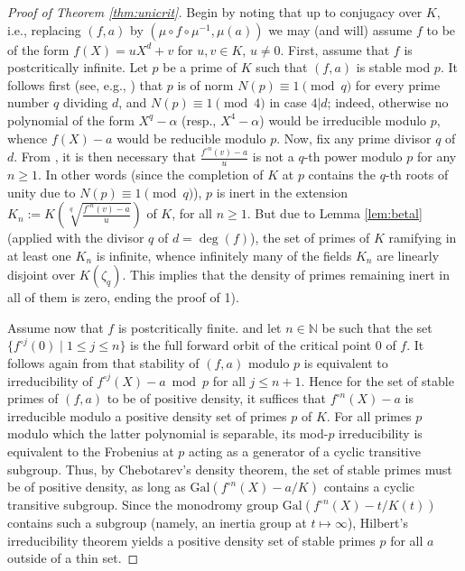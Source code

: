 \documentclass[a4paper]{amsart}
\begin{document}
\begin{proof}[Proof of Theorem \ref{thm:unicrit}]
Begin by noting that up to conjugacy over $K$, i.e., replacing $(f,a)$ by $(\mu\circ f\circ \mu^{-1}, \mu(a))$  we may (and will) assume $f$ to be of the form $f(X)=uX^d+v$ for $u,v\in K$, $u\ne 0$.
First, assume that $f$ is postcritically infinite. Let $p$ be a prime of $K$ such that $(f,a)$ is stable mod $p$. It follows first (see, e.g., \cite[Remark 14]{DDetal}) that $p$ is of norm $N(p)\equiv 1 \pmod q$ for every prime number $q$ dividing $d$, and $N(p)\equiv 1 \pmod 4$ in case $4|d$; indeed, otherwise no polynomial of the form $X^q-\alpha$ (resp., $X^4-\alpha$) would be irreducible modulo $p$, whence $f(X)-a$ would be reducible modulo $p$.
Now, fix any prime divisor $q$ of $d$. From \cite[Theorem 13]{DDetal}, it is then necessary that $\frac{f^{\circ n}(v)-a}{u}$ is not a $q$-th power modulo $p$ for any $n\ge 1$. In other words (since the completion of $K$ at $p$ contains the $q$-th roots of unity due to $N(p)\equiv 1 \pmod q$), $p$ is inert in the extension $K_n:=K\left(\sqrt[q]{\frac{f^{\circ n}(v)-a}{u}}\right)$ of $K$, for all $n\ge 1$. But due to Lemma \ref{lem:betal} (applied with the divisor $q$ of $d=\deg(f)$), the set of primes of $K$ ramifying in at least one $K_n$ is infinite, whence infinitely many of the fields $K_n$ are linearly disjoint over $K(\zeta_q)$. This implies that the density of primes %
remaining inert in all of them is zero, ending the proof of 1).

Assume now that $f$ is postcritically finite. and let $n\in \mathbb{N}$ be such that the set $\{f^{\circ j}(0)\mid 1\le j\le n\}$ is the full forward orbit of the critical point $0$ of $f$. It follows again from \cite[Theorem 13]{DDetal} that stability of $(f,a)$ modulo $p$ is equivalent to irreducibility of $f^{\circ j}(X)-a \bmod p$ for all $j\le n+1$. 
Hence for the set of stable primes of $(f,a)$ to be of positive density, it suffices that $f^{\circ n}(X)-a$ is irreducible modulo a positive density set of primes $p$ of $K$. For all primes $p$ modulo which the latter polynomial is separable, its mod-$p$ irreducibility is equivalent 
to the Frobenius at $p$ acting as a generator of a cyclic transitive subgroup. Thus, by Chebotarev's density theorem, the set of stable primes must be of positive density, as long as $\textrm{Gal}(f^{\circ n}(X)-a/K)$ contains a cyclic transitive subgroup. Since the monodromy group $\textrm{Gal}(f^{\circ n}(X)-t/K(t))$ contains such a subgroup (namely, an inertia group at $t\mapsto \infty$), Hilbert's irreducibility theorem 
yields a positive density set of stable primes $p$ for all $a$ outside of a thin set.
\end{proof}
\end{document}
